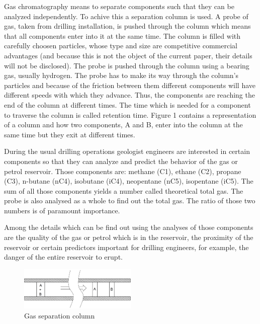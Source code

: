 \documentclass[conference]{IEEEtran}
\begin{document}
    Gas chromatography means to separate components such that they can be analyzed independently. To achive this a
    separation column is used. A probe of gas, taken from drilling installation, is pushed through the column which
    means that all components enter into it at the same time. The column is filled with carefully choosen particles,
    whose type and size are competitive commercial advantages (and because this is not the object of the current paper,
    their details will not be disclosed). The probe is pushed through the column using a bearing gas, usually hydrogen.
    The probe has to make its way through the column's particles and because of the friction between them different
    components will have different speeds with which they advance. Thus, the components are reaching the end of the 
    column at different times. The time which is needed for a component to traverse the column is called retention time.
    Figure 1 contains a representation of a column and how two components, A and B, enter into the column at the same
    time but they exit at different times.
    
    During the usual drilling operations geologist engineers are interested in certain components so that they can analyze
    and predict the behavior of the gas or petrol reservoir. Those components are: methane (C1), ethane (C2), propane (C3),
    n-butane (nC4), isobutane (iC4), neopentane (nC5), isopentane (iC5). The sum of all those components yields a number
    called theoretical total gas. The probe is also analysed as a whole to find out the total gas. The ratio of those two
    numbers is of paramount importance.
    
    Among the details which can be find out using the analyses of those components are the quality of the gas or petrol
    which is in the reservoir, the proximity of the reservoir or certain predictors important for drilling engineers, for
    example, the danger of the entire reservoir to erupt.

    \begin{figure}
        \centering
        \includegraphics[width=0.5\textwidth]{column.png}
        \caption{Gas separation column}
    \end{figure}
\end{document}
